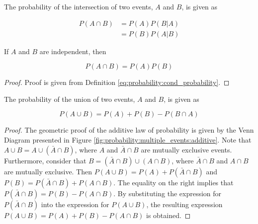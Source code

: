 \begin{theorem}
      \label{th:probability:multiple_events:multiplicative}
      The probability of the intersection of two events, $A$ and $B$, is given as

      \begin{equation}
            \begin{split}
                  P(A \cap B)
                  &= P(A)P(B \vert A) \\
                  &= P(B)P(A \vert B)
            \end{split}
      \end{equation}

      If $A$ and $B$ are independent, then

      \begin{equation}
            P(A \cap B) = P(A)P(B)
      \end{equation}
\end{theorem}

\begin{proof}
      Proof is given from Definition \ref{eq:probability:cond_probability}.
\end{proof}
\vspace*{0.5cm}

\begin{theorem}
      \label{th:probability:multiple_events:additive}
      The probability of the union of two events, $A$ and $B$, is given as

      \begin{equation}
            P(A \cup B) = P(A) + P(B) - P(B \cap A)
      \end{equation}
\end{theorem}

\begin{proof}
      The geometric proof of the additive law of probability is given by the Venn Diagram presented in Figure \ref{fig:probability:multiple_events:additive}. Note that $A \cup B = A \cup ( \bar{A} \cap B)$, where $A$ and $\bar{A} \cap B$ are mutually exclusive events. Furthermore, consider that $B = (\bar{A} \cap B) \cup (A \cap B)$, where $\bar{A} \cap B$ and $A \cap B$ are mutually exclusive. Then $P(A \cup B) = P(A) + P(\bar{A} \cap B)$ and $P(B) = P(\bar{A} \cap B) + P(A \cap B)$. The equality on the right implies that $P(\bar{A} \cap B) = P(B) - P(A \cap B)$. By substituting the expression for $P(\bar{A} \cap B)$ into the expression for $P(A \cup B)$, the resulting expression $P(A \cup B) = P(A) + P(B) - P(A \cap B)$ is obtained.
\end{proof}

